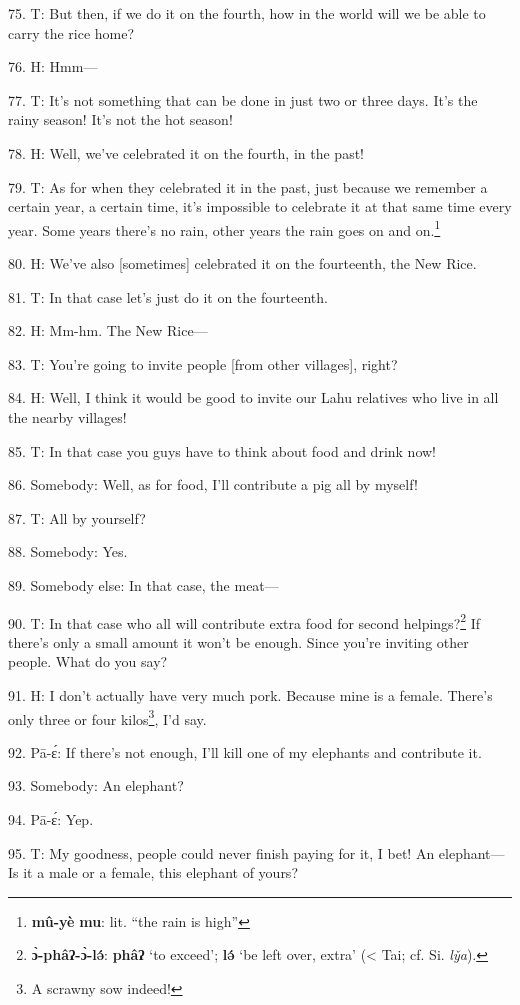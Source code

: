 75. T: But then, if we do it on the fourth, how in the world will we be able to
carry the rice home?

76. H: Hmm---

77. T: It's not something that can be done in just two or three days. It's the
rainy season! It's not the hot season!

78. H: Well, we've celebrated it on the fourth, in the past!

79. T: As for when they celebrated it in the past, just because we remember a certain
year, a certain time, it's impossible to celebrate it at that same time every year.
Some years there's no rain, other years the rain goes on and on.\footnote{\textbf{mû-yè} \textbf{mu}: lit. ``the rain is high''}

80. H: We've also [sometimes] celebrated it on the fourteenth, the New Rice.

81. T: In that case let's just do it on the fourteenth.

82. H: Mm-hm. The New Rice---

83. T: You're going to invite people [from other villages], right?

84. H: Well, I think it would be good to invite our Lahu relatives who live in
all the nearby villages!

85. T: In that case you guys have to think about food and drink now!

86. Somebody: Well, as for food, I'll contribute a pig all by myself!

87. T: All by yourself?

88. Somebody: Yes.

89. Somebody else: In that case, the meat---

90. T: In that case who all will contribute extra food for second helpings?\footnote{\textbf{ɔ̀-phâʔ-ɔ̀-lə́}: \textbf{phâʔ} `to exceed'; \textbf{lə́} `be left over, extra' (< Tai; cf. Si. \textit{ly̌a}).}
If there's only a small amount it won't be enough. Since you're inviting other
people. What do you say?

91. H: I don't actually have very much pork. Because mine is a female. There's
only three or four kilos\footnote{A scrawny sow indeed!}, I'd say.

92. Pā-ɛ́: If there's not enough, I'll kill one of my elephants and contribute
it.

93. Somebody: An elephant?

94. Pā-ɛ́: Yep.

95. T: My goodness, people could never finish paying for it, I bet! An elephant---
Is it a male or a female, this elephant of yours?


